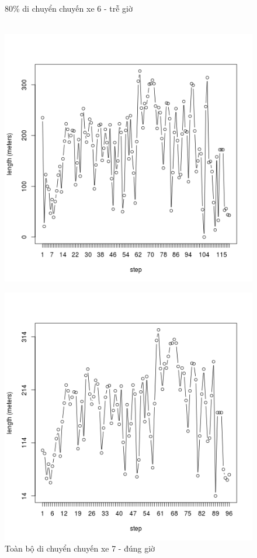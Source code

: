 \documentclass[a4paper, 13pt]{report}
\begin{document}
\begin{figure}[!htb]
  \caption*{80\% di chuyển chuyến xe 6 - trễ giờ}
\endminipage\\
  \includegraphics[width=\linewidth]{test_100_7}
  \caption*{Toàn bộ di chuyển chuyến xe 7 - đúng giờ}
\endminipage
{}
  \includegraphics[width=\linewidth]{test_80_7}

\end{figure}
\end{document}
